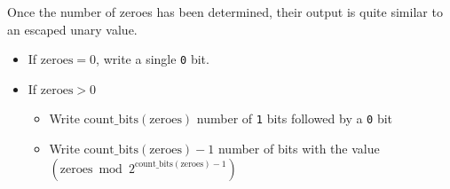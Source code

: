Once the number of zeroes has been determined, their output is
quite similar to an escaped unary value.
\begin{itemize}
\item If $\text{zeroes} = 0$, write a single \texttt{0} bit.
\item If $\text{zeroes} > 0$
\begin{itemize}
\item Write $\text{count\_bits}(\text{zeroes})$ number of \texttt{1} bits
followed by a \texttt{0} bit
\item Write $\text{count\_bits}(\text{zeroes}) - 1$ number of bits
with the value $(\text{zeroes} \bmod{2 ^ {\text{count\_bits}(\text{zeroes}) - 1}})$
\end{itemize}
\end{itemize}
